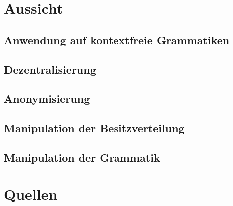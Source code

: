 \documentclass[]{article}
\begin{document}
\section{Aussicht}

\subsection*{Anwendung auf kontextfreie Grammatiken}



\subsection*{Dezentralisierung}

\subsection*{Anonymisierung}

\subsection*{Manipulation der Besitzverteilung}
\subsection*{Manipulation der Grammatik}






\newpage
\section{Quellen}





\end{document}
